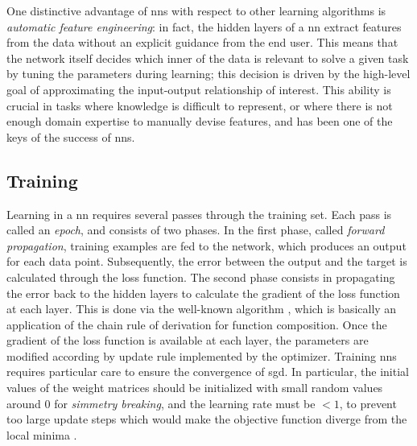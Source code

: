 One distinctive advantage of \glspl{nn} with respect to other learning algorithms is \emph{automatic feature engineering}: in fact, the hidden layers of a \gls{nn} extract features from the data without an explicit guidance from the end user. This means that the network itself decides which inner  of the data is relevant to solve a given task by tuning the parameters during learning; this decision is driven by the high-level goal of approximating the input-output relationship of interest. This ability is crucial in tasks where knowledge is difficult to represent, or where there is not enough domain expertise to manually devise features, and has been one of the keys of the success of \glspl{nn}.

\subsection{Training}\label{sec:training}
Learning in a \gls{nn} requires several passes through the training set. Each pass is called an \emph{epoch}, and consists of two phases. In the first phase, called \emph{forward propagation}, training examples are fed to the network, which produces an output for each data point. Subsequently, the error between the output and the target is calculated through the loss function. The second phase consists in propagating the error back to the hidden layers to calculate the gradient of the loss function at each layer. This is done via the well-known  algorithm \citep{rumelhart1986backprop}, which is basically an application of the chain rule of derivation for function composition. Once the gradient of the loss function is available at each layer, the parameters are modified according by update rule implemented by the optimizer. Training \glspl{nn} requires particular care to ensure the convergence of \gls{sgd}. In particular, the initial values of the weight matrices should be initialized with small random values around 0 for \emph{simmetry breaking}, and the learning rate must be $< 1$, to prevent too large update steps which would make the objective function diverge from the local minima \citep{lecun1998backprop}.

